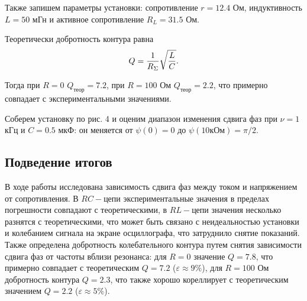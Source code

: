 \documentclass[12pt,a4paper]{article}
\begin{document}
Также запишем параметры установки:
сопротивление $r = 12.4$ Ом, индуктивность $L = 50$ мГн и активное сопротивление $R_L = 31.5$ Ом.


Теоретически добротность контура равна 
\begin{equation*}
    Q = {1 \over R_\Sigma} \sqrt{L \over C}.
\end{equation*}

Тогда при $R = 0$ $Q_{теор} = 7.2$, при $R = 100$ Ом $Q_{теор} = 2.2$, что примерно совпадает с экспериментальными значениями.
\newline

Соберем установку по рис. 4 и оценим диапазон изменения сдвига фаз при $\nu = 1$ кГц и $C = 0.5$ мкФ: он меняется от $\psi(0) = 0$ до $\psi(10кОм) = \pi/2$.

\subsection*{Подведение итогов}
В ходе работы исследована зависимость сдвига фаз между током и напряжением от сопротивления. 
В $RC-$цепи экспериментальные значения в пределах погрешности совпадают с теоретическими, в $RL-$цепи значения несколько разнятся с теоретическими, что может быть связано с неидеальностью установки и колебанием сигнала на экране осциллографа, что затруднило снятие показаний.
Также определена добротность колебательного контура путем снятия зависимости сдвига фаз от частоты вблизи резонанса: для $R = 0$ значение $Q = 7.8$, что примерно совпадает с теоретическим $Q=7.2$ ($\varepsilon \approx 9\%$), для $R=100$ Ом добротность контура $Q = 2.3$, что также хорошо кореллирует с теоретическим значением $Q = 2.2$ ($\varepsilon \approx 5\%$).
\end{document}
